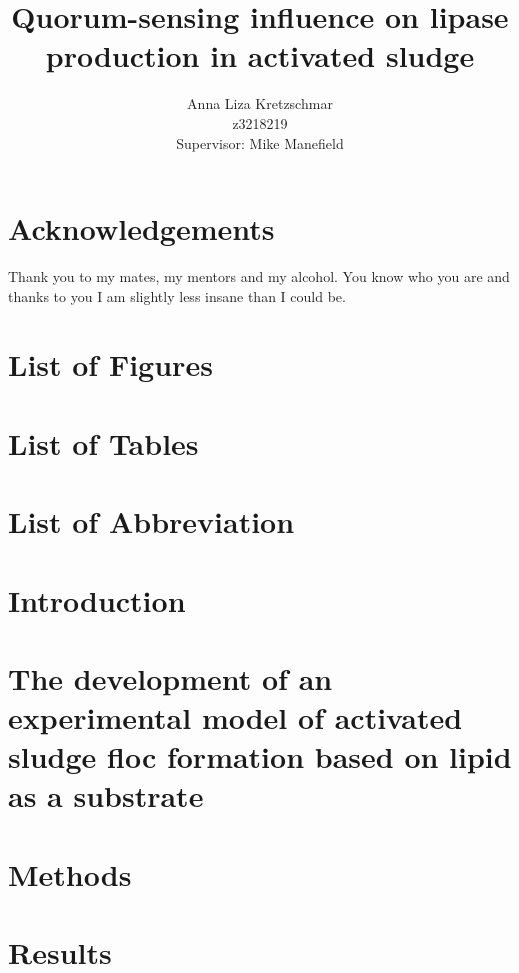 \documentclass[11pt]{article}
\title{\textbf{Quorum-sensing influence on lipase production in activated sludge}}
\author{Anna Liza Kretzschmar\\
        z3218219\\
        Supervisor: Mike Manefield}
\date{}
\begin{document}
\maketitle

\tableofcontents

\newpage


\section{Acknowledgements}
Thank you to my mates, my mentors and my alcohol. You know who you are and thanks to you I am slightly less insane than I could be.
\newpage
\section{List of Figures}
\listoffigures

\newpage
\section{List of Tables}
\listoftables

\newpage
\section{List of Abbreviation}

%

\newpage
\section{Introduction}



\section{The development of an experimental model of activated sludge floc formation based on lipid as a substrate}

%

\section{Methods}



\section{Results}
\end{document}
